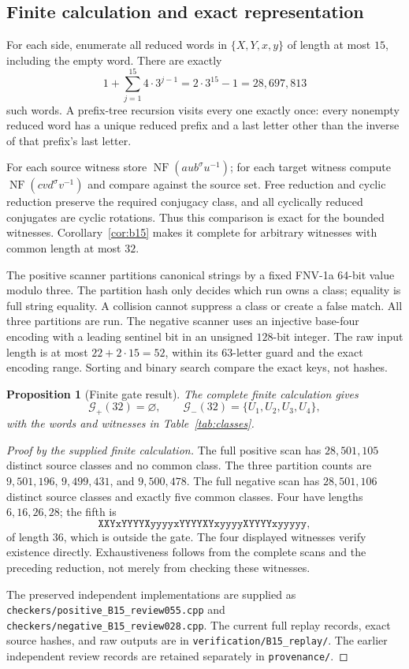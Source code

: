 \documentclass[11pt,a4paper]{article}
\newtheorem{proposition}[theorem]{Proposition}
\theoremstyle{definition}\newtheorem{definition}[theorem]{Definition}
\theoremstyle{remark}\newtheorem{remark}[theorem]{Remark}
\newcommand{\NF}{\operatorname{NF}}
\newcommand{\word}[1]{\texttt{#1}}
\newcommand{\pathfile}[1]{\nolinkurl{#1}}
\begin{document}
\subsection{Finite calculation and exact representation}\label{sec:census}
For each side, enumerate all reduced words in $\{X,Y,x,y\}$ of length at most $15$, including the empty word. There are exactly
\[
1+\sum_{j=1}^{15}4\cdot3^{j-1}=2\cdot3^{15}-1=28,697,813
\]
such words. A prefix-tree recursion visits every one exactly once: every nonempty reduced word has a unique reduced prefix and a last letter other than the inverse of that prefix's last letter.

For each source witness store $\NF(aub^\sigma u^{-1})$; for each target witness compute $\NF(cvd^\sigma v^{-1})$ and compare against the source set. Free reduction and cyclic reduction preserve the required conjugacy class, and all cyclically reduced conjugates are cyclic rotations. Thus this comparison is exact for the bounded witnesses. Corollary~\ref{cor:b15} makes it complete for arbitrary witnesses with common length at most $32$.

The positive scanner partitions canonical strings by a fixed FNV-1a 64-bit value modulo three. The partition hash only decides which run owns a class; equality is full string equality. A collision cannot suppress a class or create a false match. All three partitions are run. The negative scanner uses an injective base-four encoding with a leading sentinel bit in an unsigned $128$-bit integer. The raw input length is at most $22+2\cdot15=52$, within its $63$-letter guard and the exact encoding range. Sorting and binary search compare the exact keys, not hashes.

\begin{proposition}[Finite gate result]\label{prop:gate}
The complete finite calculation gives
\[
\mathcal G_+(32)=\varnothing,\qquad
\mathcal G_-(32)=\{U_1,U_2,U_3,U_4\},
\]
with the words and witnesses in Table~\ref{tab:classes}.
\end{proposition}
\begin{proof}[Proof by the supplied finite calculation]
The full positive scan has $28,501,105$ distinct source classes and no common class. The three partition counts are $9,501,196$, $9,499,431$, and $9,500,478$. The full negative scan has $28,501,106$ distinct source classes and exactly five common classes. Four have lengths $6,16,26,28$; the fifth is
\[
 \word{XXYxYYYYXyyyyxYYYYXYxyyyyXYYYYxyyyyy},
\]
of length $36$, which is outside the gate. The four displayed witnesses verify existence directly. Exhaustiveness follows from the complete scans and the preceding reduction, not merely from checking these witnesses.

The preserved independent implementations are supplied as
\pathfile{checkers/positive_B15_review055.cpp} and
\pathfile{checkers/negative_B15_review028.cpp}.
The current full replay records, exact source hashes, and raw outputs are in
\pathfile{verification/B15_replay/}. The earlier independent review records are retained separately in \pathfile{provenance/}.
\end{proof}
\end{document}
